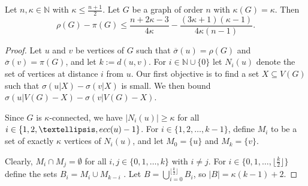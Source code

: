 \documentclass[10pt,a4paper]{amsart}
\begin{document}
\begin{theorem}\label{theo:remoteness-proximity}
Let $n, \kappa \in \mathbb{N}$ with $\kappa \leq \frac{n+1}{2}$. Let $G$ be a graph of order 
$n$ with $\kappa(G) = \kappa$. Then
\[
\rho(G) - \pi(G) \leq \frac{n+2\kappa-3}{4\kappa} 
              - \frac{(3\kappa+1)(\kappa-1)}{4\kappa (n-1)}.       \]                           
\end{theorem}

\begin{proof}  
Let \( u \) and \( v \) be vertices of \( G \) such that \( \overline{\sigma}(u) = \rho(G) \) 
and \( \overline{\sigma}(v) = \pi(G) \), and let $k:= d(u,v)$. For $i \in \mathbb{N} \cup \{0\}$ let 
\( N_i(u) \) denote the set of vertices at distance \( i \) from \( u \). 
Our first objective is to find a set \( X \subseteq V(G) \) such that \( \sigma(u|X) - \sigma(v|X) \) 
is small. We then bound \( \sigma(u|V(G) - X) - \sigma(v|V(G) - X) \).

Since $G$ is $\kappa$-connected, we have $|N_i(u)| \geq \kappa$ for all 
$i\in \{1,2,\ldots,{\rm ecc}(u)-1\}$. For \( i \in \{1, 2, \ldots, k-1\} \), define $M_i$ 
to be a set of exactly $\kappa$ vertices of $N_i(u)$, and let \( M_0 =\{u\} \) and \(M_k = \{ v\} \).

Clearly, $M_i \cap M_j = \emptyset$ for all $i, j \in \{0, 1,\ldots,k\}$ with $i\neq j$. 
For \( i \in \{0, 1, \ldots, \lfloor\frac{k}{2}\rfloor\} \) define the sets 
\( B_i = M_i \cup M_{k-i} \) . Let 
\( B = \bigcup_{i=0}^{\lfloor\frac{k}{2}\rfloor} B_i \), so \( |B| = \kappa(k - 1)+2 \).


\end{proof}
\end{document}
